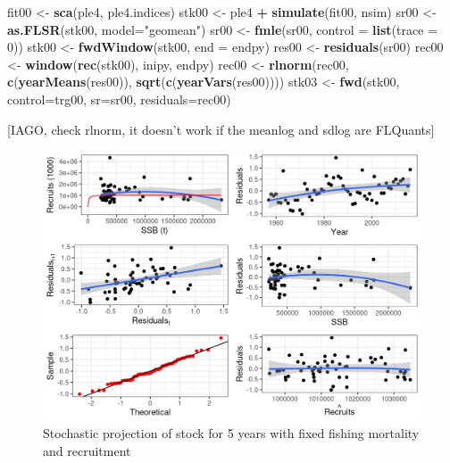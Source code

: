 \documentclass[
]{book}
\newenvironment{Shaded}{\begin{snugshade}}{\end{snugshade}}
\newcommand{\AttributeTok}[1]{\textcolor[rgb]{0.13,0.29,0.53}{#1}}
\newcommand{\DecValTok}[1]{\textcolor[rgb]{0.00,0.00,0.81}{#1}}
\newcommand{\FunctionTok}[1]{\textcolor[rgb]{0.13,0.29,0.53}{\textbf{#1}}}
\newcommand{\NormalTok}[1]{#1}
\newcommand{\OtherTok}[1]{\textcolor[rgb]{0.56,0.35,0.01}{#1}}
\newcommand{\SpecialCharTok}[1]{\textcolor[rgb]{0.81,0.36,0.00}{\textbf{#1}}}
\newcommand{\StringTok}[1]{\textcolor[rgb]{0.31,0.60,0.02}{#1}}
\begin{document}
\begin{Shaded}
\begin{Highlighting}[]
\NormalTok{fit00 }\OtherTok{\textless{}{-}} \FunctionTok{sca}\NormalTok{(ple4, ple4.indices) }
\NormalTok{stk00 }\OtherTok{\textless{}{-}}\NormalTok{ ple4 }\SpecialCharTok{+} \FunctionTok{simulate}\NormalTok{(fit00, nsim)}
\NormalTok{sr00 }\OtherTok{\textless{}{-}} \FunctionTok{as.FLSR}\NormalTok{(stk00, }\AttributeTok{model=}\StringTok{"geomean"}\NormalTok{)}
\NormalTok{sr00 }\OtherTok{\textless{}{-}} \FunctionTok{fmle}\NormalTok{(sr00, }\AttributeTok{control =} \FunctionTok{list}\NormalTok{(}\AttributeTok{trace =} \DecValTok{0}\NormalTok{))}
\NormalTok{stk00 }\OtherTok{\textless{}{-}} \FunctionTok{fwdWindow}\NormalTok{(stk00, }\AttributeTok{end =}\NormalTok{ endpy)}
\NormalTok{res00 }\OtherTok{\textless{}{-}} \FunctionTok{residuals}\NormalTok{(sr00)}
\NormalTok{rec00 }\OtherTok{\textless{}{-}} \FunctionTok{window}\NormalTok{(}\FunctionTok{rec}\NormalTok{(stk00), inipy, endpy)}
\NormalTok{rec00 }\OtherTok{\textless{}{-}} \FunctionTok{rlnorm}\NormalTok{(rec00, }\FunctionTok{c}\NormalTok{(}\FunctionTok{yearMeans}\NormalTok{(res00)), }\FunctionTok{sqrt}\NormalTok{(}\FunctionTok{c}\NormalTok{(}\FunctionTok{yearVars}\NormalTok{(res00))))}
\NormalTok{stk03 }\OtherTok{\textless{}{-}} \FunctionTok{fwd}\NormalTok{(stk00, }\AttributeTok{control=}\NormalTok{trg00, }\AttributeTok{sr=}\NormalTok{sr00, }\AttributeTok{residuals=}\NormalTok{rec00)}
\end{Highlighting}
\end{Shaded}

{[}IAGO, check rlnorm, it doesn't work if the meanlog and sdlog are FLQuants{]}

\begin{figure}
\centering
\includegraphics{_bookdown_files/_main_files/figure-html/unnamed-chunk-101-1.png}
\caption{\label{fig:unnamed-chunk-101}Stochastic projection of stock for 5 years with fixed fishing mortality and recruitment}
\end{figure}
\end{document}
